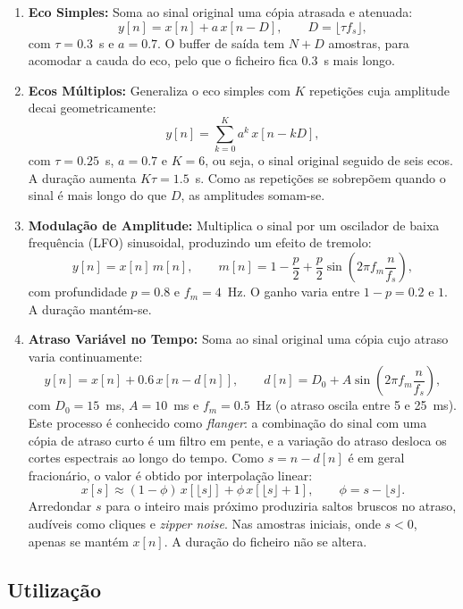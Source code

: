 \documentclass[11pt,a4paper]{report}
\begin{document}
\begin{enumerate}
    \item \textbf{Eco Simples:}
    Soma ao sinal original uma cópia atrasada e atenuada:
    \[
    y[n] = x[n] + a\,x[n-D], \qquad D = \lfloor \tau f_s \rfloor,
    \]
    com $\tau = 0.3$~s e $a = 0.7$. O buffer de saída tem $N + D$ amostras, para acomodar a cauda do eco, pelo que o ficheiro fica $0.3$~s mais longo.

    \item \textbf{Ecos Múltiplos:}
    Generaliza o eco simples com $K$ repetições cuja amplitude decai geometricamente:
    \[
    y[n] = \sum_{k=0}^{K} a^{k}\,x[n-kD],
    \]
    com $\tau = 0.25$~s, $a = 0.7$ e $K = 6$, ou seja, o sinal original seguido de seis ecos. A duração aumenta $K\tau = 1.5$~s. Como as repetições se sobrepõem quando o sinal é mais longo do que $D$, as amplitudes somam-se.

    \item \textbf{Modulação de Amplitude:}
     Multiplica o sinal por um oscilador de baixa frequência (LFO) sinusoidal, produzindo um efeito de tremolo:
    \[
    y[n] = x[n]\,m[n], \qquad m[n] = 1 - \frac{p}{2} + \frac{p}{2}\sin\!\left(2\pi f_m \frac{n}{f_s}\right),
    \]
    com profundidade $p = 0.8$ e $f_m = 4$~Hz. O ganho varia entre $1-p = 0.2$ e $1$. A duração mantém-se.
    
    \item \textbf{Atraso Variável no Tempo:}
    Soma ao sinal original uma cópia cujo atraso varia continuamente:
    \[
    y[n] = x[n] + 0.6\,x[n - d[n]], \qquad d[n] = D_0 + A\sin\!\left(2\pi f_m \frac{n}{f_s}\right),
    \]
    com $D_0 = 15$~ms, $A = 10$~ms e $f_m = 0.5$~Hz (o atraso oscila entre 5 e 25~ms). Este processo é conhecido como \emph{flanger}: a combinação do sinal com uma cópia de atraso curto é um filtro em pente, e a variação do atraso desloca os cortes espectrais ao longo do tempo. Como $s = n - d[n]$ é em geral fracionário, o valor é obtido por interpolação linear:
    \[
    x[s] \approx (1-\phi)\,x[\lfloor s \rfloor] + \phi\,x[\lfloor s \rfloor + 1], \qquad \phi = s - \lfloor s \rfloor.
    \]
    Arredondar $s$ para o inteiro mais próximo produziria saltos bruscos no atraso, audíveis como cliques e \emph{zipper noise}. Nas amostras iniciais, onde $s<0$, apenas se mantém $x[n]$. A duração do ficheiro não se altera.
\end{enumerate}

\subsection{Utilização}
\end{document}

